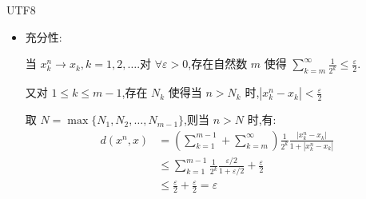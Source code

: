 \documentclass[12pt,letterpaper,boxed]{hmcpset}
\begin{document}
\begin{CJK}{UTF8}{}
\begin{solution}[(\romannumeral2)]
\begin{itemize}
  当 $d(x^n,x) &= \sum_{k=1}^\infty \frac{1}{2^k} \frac{|x_^n-x_k|}{1+|x_k^n-x_k|}\to 0$ 时.\\
  $\frac{|x_^n-x_k|}{1+|x_k^n-x_k|} \leq 2^k d(x^n,x) \to 0 $,于是 $|x_k^n-x_k|\to 0,\qquad k=1,2,\ldots,m,\ldots$.
  \item 充分性:

  当 $x_k^n \to x_k,k=1,2,\ldots. $对 $\forall \varepsilon > 0$,存在自然数 $m$ 使得
  $\sum_{k=m}^\infty \frac{1}{2^k}\leq \frac{\varepsilon}{2} $.

  又对 $ 1\leq k \leq m-1$,存在 $ N_k$ 使得当 $n>N_k$ 时,$|x_k^n-x_k|<\frac{\varepsilon}{2}$

  取 $N=\max\{N_1,N_2,\ldots,N_{m-1}\}$,则当 $n>N$ 时,有:
     \begin{align*}
     d(x^n,x)& =(\sum_{k=1}^{m-1}+\sum_{k=m}^\infty) \frac{1}{2^k} \frac{|x_k^n-x_k|}{1+|x_k^n-x_k|}\\
     &\leq \sum_{k=1}^{m-1}\frac{1}{2^k} \frac{\varepsilon/2}{1+\varepsilon/2}+\frac{\varepsilon}{2}\\
     &\leq \frac{\varepsilon}{2}+\frac{\varepsilon}{2} = \varepsilon
     \end{align*}
  \end{itemize}
\end{solution}







\end{CJK}
\end{document}
